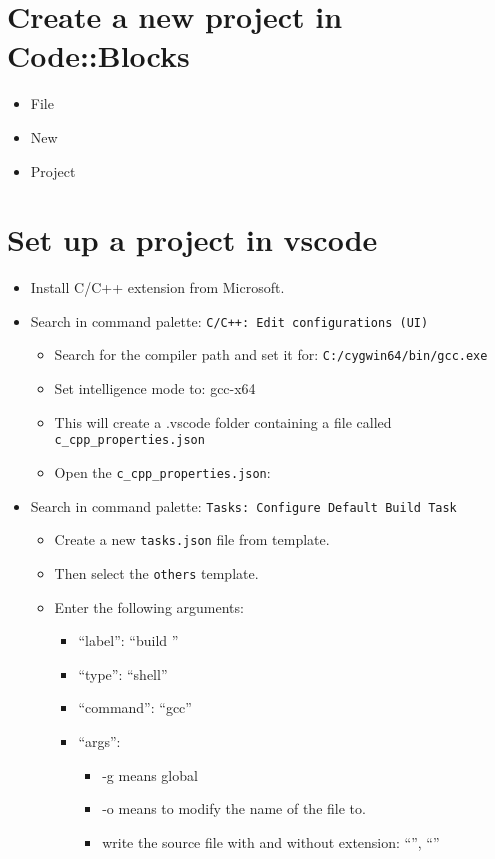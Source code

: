 \section{Create a new project in Code::Blocks}
\begin{itemize}[label=$\downarrow$]
   \item File 
   \item New 
   \item Project
\end{itemize}

\section{Set up a project in vscode}
\begin{itemize}[label=$\downarrow$]
   \item Install C/C++ extension from Microsoft. 
   \item Search in command palette: \verb|C/C++: Edit configurations (UI)|
      \begin{itemize}
         \item Search for the compiler path and set it for: \verb|C:/cygwin64/bin/gcc.exe| 
         \item Set intelligence mode to: gcc-x64
         \item This will create a .vscode folder containing a file called \verb|c_cpp_properties.json|
         \item Open the \verb|c_cpp_properties.json|:
      \end{itemize}
   \item Search in command palette: \verb|Tasks: Configure Default Build Task|
      \begin{itemize}
         \item Create a new \verb|tasks.json| file from template.
         \item Then select the \verb|others| template.
         \item Enter the following arguments: 
            \begin{itemize}
               \item ``label'': ``build ''
               \item ``type'': ``shell''
               \item ``command'': ``gcc''
               \item ``args'': 
                  \begin{itemize}
                     \item -g means global 
                     \item -o means to modify the name of the file to.
                     \item write the source file with and without extension: ``'', ``''
                  \end{itemize}
            \end{itemize}
      \end{itemize}
   

\end{itemize}
